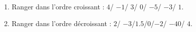 
\begin{exercice}\label{exo2smath-0050}

    \begin{enumerate}
        \item
            Ranger dans l'ordre croissant : \( 4\)/ \( -1\)/ \( 3\)/ \( 0\)/ \( -5\)/ \( -3\)/ \( 1\).
        \item
            Ranger dans l'ordre décroissant : \( 2\)/ \( -3\)/\( 1.5\)/\( 0\)/\( -2\)/ \( -40\)/ \( 4\).
    \end{enumerate}

\end{exercice}
